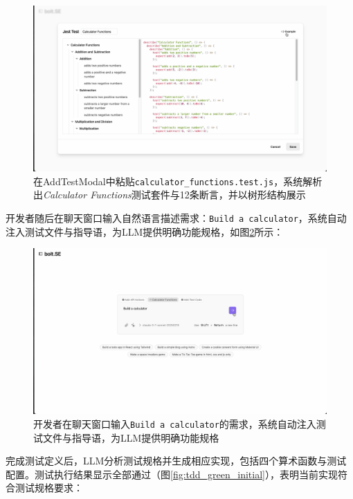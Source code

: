 \begin{figure}
  \centering
  \includegraphics[width=.9\textwidth]{figures/screenshots/tdd/add_test_modal.png}
  \caption{在AddTestModal中粘贴\texttt{calculator\_functions.test.js}，系统解析出\textit{Calculator Functions}测试套件与12条断言，并以树形结构展示}
  \label{fig:tdd_add_test}
\end{figure}

开发者随后在聊天窗口输入自然语言描述需求：\texttt{Build a calculator}，系统自动注入测试文件与指导语，为LLM提供明确功能规格，如图\ref{fig:tdd_prompt}所示：

\begin{figure}
  \centering
  \includegraphics[width=.9\textwidth]{figures/screenshots/tdd/calculator_prompt.png}
  \caption{开发者在聊天窗口输入\texttt{Build a calculator}的需求，系统自动注入测试文件与指导语，为LLM提供明确功能规格}
  \label{fig:tdd_prompt}
\end{figure}

完成测试定义后，LLM分析测试规格并生成相应实现，包括四个算术函数与测试配置。测试执行结果显示全部通过（图\ref{fig:tdd_green_initial}），表明当前实现符合测试规格要求：

